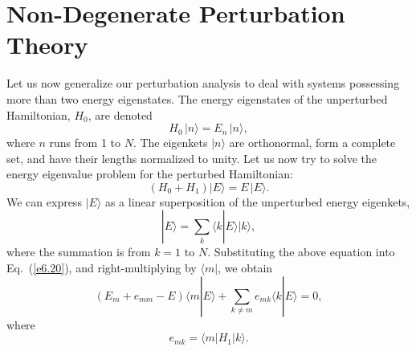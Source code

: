 \section{Non-Degenerate Perturbation Theory}\label{s6.3}
Let us now generalize our perturbation analysis to deal with systems
possessing  more than two energy eigenstates. The energy eigenstates of the
unperturbed Hamiltonian, $H_0$, are denoted
\begin{equation}
H_0\, |n\rangle = E_n\, |n\rangle,
\end{equation}
where $n$ runs from 1 to $N$. The eigenkets $|n\rangle$ are orthonormal,
form a complete set, and have their lengths normalized to unity. 
Let us now try to solve the energy eigenvalue
problem for the perturbed Hamiltonian:
\begin{equation}\label{e6.20}
(H_0 + H_1) |E\rangle = E\, |E\rangle.
\end{equation}
We can express $|E\rangle$ as a linear superposition of the unperturbed energy
eigenkets,
\begin{equation}
|E\rangle = \sum_k \langle k | E\rangle |k\rangle,
\end{equation}
where the summation is from $k=1$ to $N$. Substituting the above
equation into Eq.~(\ref{e6.20}), and right-multiplying by $\langle m|$, we obtain
\begin{equation}\label{e6.22}
(E_m + e_{mm} - E) \langle m|E\rangle + \sum_{k\neq m} e_{mk} \langle k|E\rangle = 0,
\end{equation}
where
\begin{equation}
e_{mk} = \langle m |H_1| k\rangle.
\end{equation}

